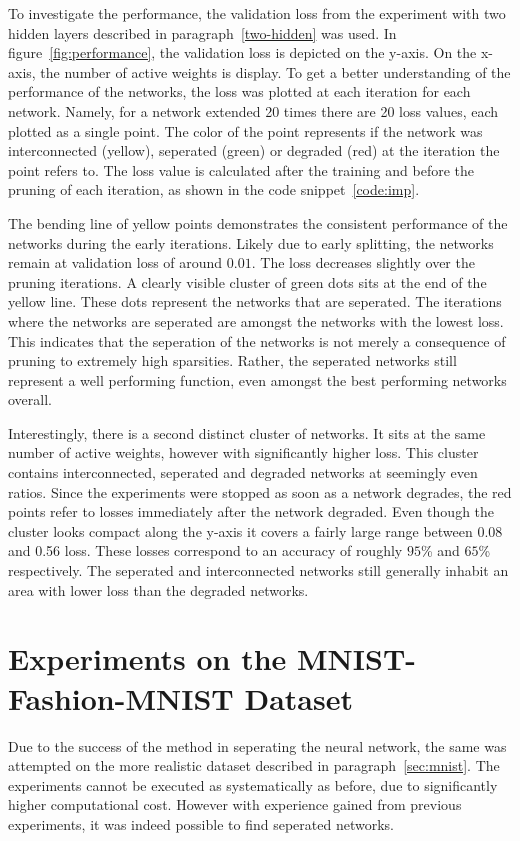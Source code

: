 To investigate the performance, the validation loss from the experiment with two hidden layers described in paragraph~\ref{two-hidden} was used.
In figure~\ref{fig:performance}, the validation loss is depicted on the y-axis.
On the x-axis, the number of active weights is display.
To get a better understanding of the performance of the networks, the loss was plotted at each iteration for each network.
Namely, for a network extended 20 times there are 20 loss values, each plotted as a single point.
The color of the point represents if the network was interconnected (yellow), seperated (green) or degraded (red) at the iteration the point refers to.
The loss value is calculated after the training and before the pruning of each iteration, as shown in the code snippet~\ref{code:imp}.

The bending line of yellow points demonstrates the consistent performance of the networks during the early iterations.
Likely due to early splitting, the networks remain at validation loss of around $0.01$.
The loss decreases slightly over the pruning iterations.
A clearly visible cluster of green dots sits at the end of the yellow line.
These dots represent the networks that are seperated.
The iterations where the networks are seperated are amongst the networks with the lowest loss.
This indicates that the seperation of the networks is not merely a consequence of pruning to extremely high sparsities.
Rather, the seperated networks still represent a well performing function, even amongst the best performing networks overall.

Interestingly, there is a second distinct cluster of networks.
It sits at the same number of active weights, however with significantly higher loss.
This cluster contains interconnected, seperated and degraded networks at seemingly even ratios.
Since the experiments were stopped as soon as a network degrades, the red points refer to losses immediately after the network degraded.
Even though the cluster looks compact along the y-axis it covers a fairly large range between 0.08 and 0.56 loss. These losses correspond to an accuracy of roughly $95$\% and $65$\% respectively.
The seperated and interconnected networks still generally inhabit an area with lower loss than the degraded networks.


\section{Experiments on the MNIST-Fashion-MNIST Dataset}
Due to the success of the method in seperating the neural network, the same was attempted on the more realistic dataset described in paragraph~\ref{sec:mnist}.
The experiments cannot be executed as systematically as before, due to significantly higher computational cost.
However with experience gained from previous experiments, it was indeed possible to find seperated networks.

